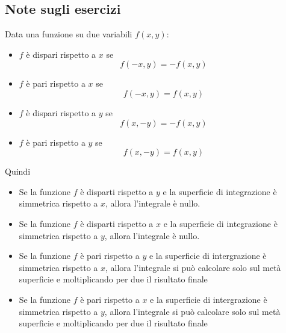 \subsection*{Note sugli esercizi}
Data una funzione su due variabili $f(x,y)$:
\begin{itemize}
    \item $f$ è dispari rispetto a $x$ se 
    \[
        f(-x,y) = -f(x,y)
    \]
    \item $f$ è pari rispetto a $x$ se 
    \[
        f(-x,y) = f(x,y)
    \]
    \item $f$ è dispari rispetto a $y$ se 
    \[
        f(x,-y) = -f(x,y)
    \]
    \item $f$ è pari rispetto a $y$ se 
    \[
        f(x,-y) = f(x,y)
    \]
\end{itemize}
Quindi
\begin{itemize}
    \item Se la funzione $f$ è disparti rispetto a $y$ e la superficie di integrazione è simmetrica rispetto a $x$, allora l'integrale è nullo.\newline
    \item Se la funzione $f$ è disparti rispetto a $x$ e la superficie di integrazione è simmetrica rispetto a $y$, allora l'integrale è nullo.
    \item Se la funzione $f$ è pari rispetto a $y$ e la superficie di intergrazione è simmetrica rispetto a $x$, allora l'integrale si può calcolare solo sul metà superficie e moltiplicando per due il risultato finale    \item Se la funzione $f$ è pari rispetto a $x$ e la superficie di intergrazione è simmetrica rispetto a $y$, allora l'integrale si può calcolare solo sul metà superficie e moltiplicando per due il risultato finale
\end{itemize}